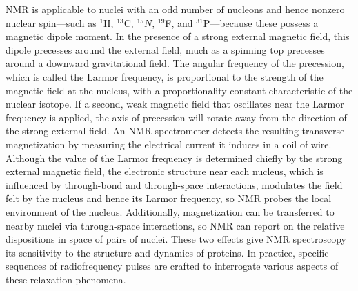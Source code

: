\documentclass[9pt,review]{livecoms}
\begin{document}
NMR is applicable to nuclei with an odd number of nucleons and hence nonzero nuclear spin---such as $^1$H, $^{13}$C, $^{15}N$, $^{19}$F, and $^{31}$P---because these possess a magnetic dipole moment.
In the presence of a strong external magnetic field, this dipole precesses around the external field, much as a spinning top precesses around a downward gravitational field.
The angular frequency of the precession, which is called the Larmor frequency, is proportional to the strength of the magnetic field at the nucleus, with a proportionality constant characteristic of the nuclear isotope.
If a second, weak magnetic field that oscillates near the Larmor frequency is applied, the axis of precession will rotate away from the direction of the strong external field.
An NMR spectrometer detects the resulting transverse magnetization by measuring the electrical current it induces in a coil of wire.
Although the value of the Larmor frequency is determined chiefly by the strong external magnetic field, the electronic structure near each nucleus, which is influenced by through-bond and through-space interactions, modulates the field felt by the nucleus and hence its Larmor frequency, so NMR probes the local environment of the nucleus.
Additionally, magnetization can be transferred to nearby nuclei via through-space interactions, so NMR can report on the relative dispositions in space of pairs of nuclei.
These two effects give NMR spectroscopy its sensitivity to the structure and dynamics of proteins.
In practice, specific sequences of radiofrequency pulses are crafted to interrogate various aspects of these relaxation phenomena. 
\end{document}
